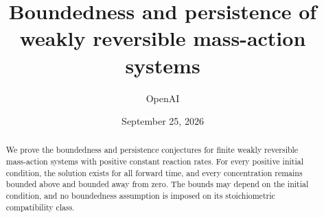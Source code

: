 \documentclass[11pt]{article}
\title{Boundedness and persistence of\\weakly reversible mass-action systems}
\author{OpenAI}
\date{September 25, 2026}
\theoremstyle{definition}
\theoremstyle{remark}
\numberwithin{equation}{section}
\begin{document}
\maketitle
\begin{abstract}
We prove the boundedness and persistence conjectures for finite weakly
reversible mass-action systems with positive constant reaction rates.
For every positive initial condition, the solution exists for all forward
time, and every concentration remains bounded above and bounded away from
zero. The bounds may depend on the initial condition, and no boundedness
assumption is imposed on its stoichiometric compatibility class.
\end{abstract}





\end{document}
